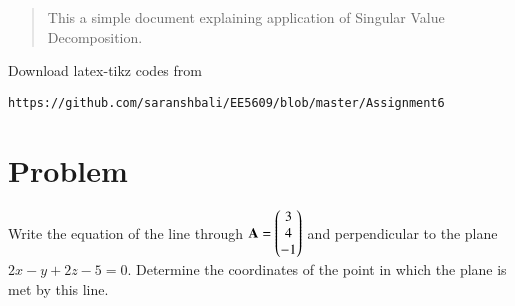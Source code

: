 \documentclass[journal,12pt,twocolumn]{IEEEtran}
\begin{document}
%
\begin{abstract}
This a simple document explaining application of Singular Value Decomposition.
\end{abstract}
%
%
Download latex-tikz codes from 
%
\begin{lstlisting}
https://github.com/saranshbali/EE5609/blob/master/Assignment6
\end{lstlisting}
%
\section{Problem}
Write the equation of the line through $\mathbf{A} = \begin{pmatrix}3 \\4\\-1\end{pmatrix}$ and perpendicular to the plane $2x-y+2z-5=0$. Determine the coordinates of the point in which the plane is met by this line.   
\end{document}
